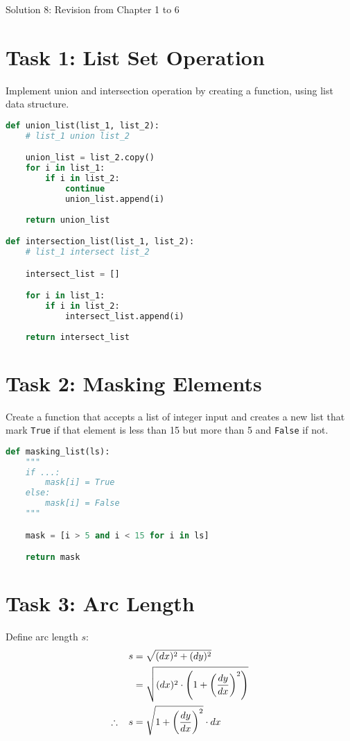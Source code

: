 \documentclass[11pt]{article}
\begin{document}
\begin{center}
    \Large{Solution 8: Revision from Chapter 1 to 6}
\end{center}

\section*{Task 1: List Set Operation}
Implement union and intersection operation by creating a function, using list data structure.

\begin{lstlisting}[language=Python]
def union_list(list_1, list_2):
    # list_1 union list_2

    union_list = list_2.copy()
    for i in list_1:
        if i in list_2:
            continue
            union_list.append(i)
    
    return union_list

def intersection_list(list_1, list_2):
    # list_1 intersect list_2

    intersect_list = []

    for i in list_1:
        if i in list_2:
            intersect_list.append(i)
    
    return intersect_list
\end{lstlisting}


\section*{Task 2: Masking Elements}
Create a function that accepts a list of integer input and creates a new list that mark \texttt{True} if that element is less than 15 but more than 5 and \texttt{False} if not.

\begin{lstlisting}[language=Python]
def masking_list(ls):
    """
    if ...:
        mask[i] = True
    else:
        mask[i] = False
    """

    mask = [i > 5 and i < 15 for i in ls]

    return mask
\end{lstlisting}

\section*{Task 3: Arc Length}
Define arc length \(s\):
\[
\begin{aligned}
    s &= \sqrt{(dx)^2 + (dy)^2}\\
    &= \sqrt{(dx)^2 \cdot \left(1 + \left(\frac{dy}{dx} \right)^2 \right)}\\
    \therefore \hspace{0.3cm} s &= \sqrt{1 + \left(\frac{dy}{dx} \right)^2} \cdot dx
\end{aligned}
\]
\end{document}
